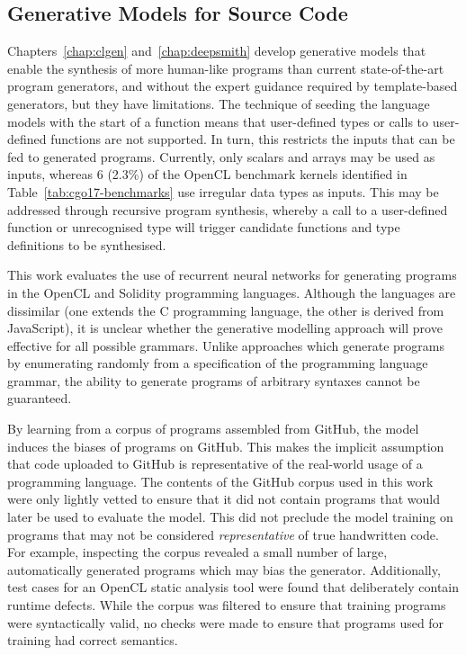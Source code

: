 \subsection{Generative Models for Source Code}

Chapters~\ref{chap:clgen} and~\ref{chap:deepsmith} develop generative models that enable the synthesis of more human-like programs than current state-of-the-art program generators, and without the expert guidance required by template-based generators, but they have limitations. The technique of seeding the language models with the start of a function means that user-defined types or calls to user-defined functions are not supported. In turn, this restricts the inputs that can be fed to generated programs. Currently, only scalars and arrays may be used as inputs, whereas 6 (2.3\%) of the OpenCL benchmark kernels identified in Table~\ref{tab:cgo17-benchmarks} use irregular data types as inputs. This may be addressed through recursive program synthesis, whereby a call to a user-defined function or unrecognised type will trigger candidate functions and type definitions to be synthesised.

This work evaluates the use of recurrent neural networks for generating programs in the OpenCL and Solidity programming languages. Although the languages are dissimilar (one extends the C programming language, the other is derived from JavaScript), it is unclear whether the generative modelling approach will prove effective for all possible grammars. Unlike approaches which generate programs by enumerating randomly from a specification of the programming language grammar, the ability to generate programs of arbitrary syntaxes cannot be guaranteed.

By learning from a corpus of programs assembled from GitHub, the model induces the biases of programs on GitHub. This makes the implicit assumption that code uploaded to GitHub is representative of the real-world usage of a programming language. The contents of the GitHub corpus used in this work were only lightly vetted to ensure that it did not contain programs that would later be used to evaluate the model. This did not preclude the model training on programs that may not be considered \emph{representative} of true handwritten code. For example, inspecting the corpus revealed a small number of large, automatically generated programs which may bias the generator. Additionally, test cases for an OpenCL static analysis tool were found that deliberately contain runtime defects. While the corpus was filtered to ensure that training programs were syntactically valid, no checks were made to ensure that programs used for training had correct semantics.


